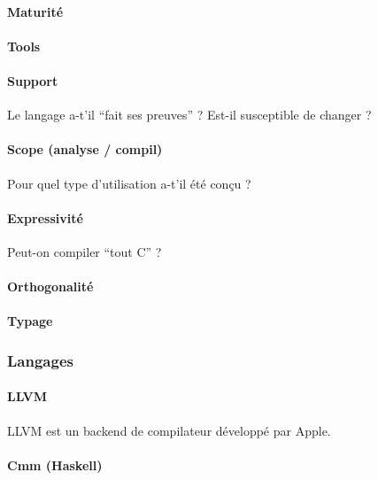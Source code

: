 \paragraph{Maturité}

\paragraph{Tools}

\paragraph{Support}

Le langage a-t'il ``fait ses preuves'' ? Est-il susceptible de changer ?

\paragraph{Scope (analyse / compil)}

Pour quel type d'utilisation a-t'il été conçu ?

\paragraph{Expressivité}

Peut-on compiler ``tout C'' ?

\paragraph{Orthogonalité}

\paragraph{Typage}

\subsubsection{Langages}

\paragraph{LLVM}

LLVM\cite{llvm-pres} est un backend de compilateur développé par Apple.

\paragraph{Cmm (Haskell)}

